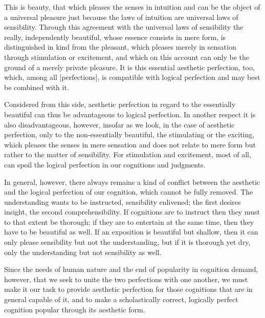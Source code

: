     This is beauty, that which pleases the senses in intuition
    and can be the object of a universal pleasure
    just because the laws of intuition are
    universal laws of sensibility.
    Through this agreement with
    the universal laws of sensibility
    the really, independently beautiful,
    whose essence consists in mere form,
    is distinguished in kind from the pleasant,
    which pleases merely in sensation
    through stimulation or excitement,
    and which on this account can only be
    the ground of a merely private pleasure.
    It is this essential aesthetic perfection, too,
    which, among all [perfections], is compatible with
    logical perfection and may best be combined with it.

        Considered from this side,
        aesthetic perfection in regard to the essentially beautiful
        can thus be advantageous to logical perfection.
        In another respect it is also disadvantageous, however,
        insofar as we look, in the case of aesthetic perfection,
        only to the non-essentially beautiful,
        the stimulating or the exciting,
        which pleases the senses in mere sensation
        and does not relate to mere form
        but rather to the matter of sensibility.
        For stimulation and excitement, most of all,
        can spoil the logical perfection
        in our cognitions and judgments.

        In general, however, there always remains a kind of conflict
        between the aesthetic and the logical perfection of our cognition,
        which cannot be fully removed.
        The understanding wants to be instructed, sensibility enlivened;
        the first desires insight, the second comprehensibility.
        If cognitions are to instruct
        then they must to that extent be thorough;
        if they are to entertain at the same time,
        then they have to be beautiful as well.
        If an exposition is beautiful but shallow,
        then it can only please sensibility
        but not the understanding,
        but if it is thorough yet dry,
        only the understanding
        but not sensibility as well.

        Since the needs of human nature
        and the end of popularity in cognition
        demand, however, that we seek to unite
        the two perfections with one another,
        we must make it our task to provide
        aesthetic perfection for those cognitions
        that are in general capable of it,
        and to make a scholastically correct,
        logically perfect cognition
        popular through its aesthetic form.

